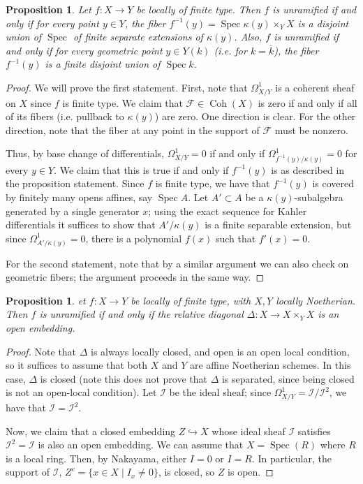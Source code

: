 \documentclass[10pt]{article}
\newtheorem{prop}[thm]{Proposition}
\theoremstyle{definition}
\DeclareMathOperator{\Coh}{Coh}
\DeclareMathOperator{\Spec}{Spec}
\begin{document}
\begin{prop}
Let $f: X \rightarrow Y$ be locally of finite type.  Then $f$ is unramified if and only if for every point $y \in Y$, the fiber $f^{-1}(y) = \Spec \kappa(y) \times_Y X$ is a disjoint union of $\Spec$ of finite separate extensions of $\kappa(y)$.  Also, $f$ is unramified if and only if for every geometric point $y \in Y(k)$ (i.e. for $k=\overline{k}$), the fiber $f^{-1}(y)$ is a finite disjoint union of $\Spec k$.
\end{prop}
\begin{proof}
We will prove the first statement.  First, note that $\Omega^1_{X/Y}$ is a coherent sheaf on $X$ since $f$ is finite type.  We claim that $\mathcal{F} \in \Coh(X)$ is zero if and only if all of its fibers (i.e. pullback to $\kappa(y)$) are zero.  One direction is clear.  For the other direction, note that the fiber at any point in the support of $\mathcal{F}$ must be nonzero.

Thus, by base change of differentials, $\Omega^1_{X/Y} = 0$ if and only if $\Omega^1_{f^{-1}(y)/\kappa(y)} = 0$ for every $y \in Y$.  We claim that this is true if and only if $f^{-1}(y)$ is as described in the proposition statement.  Since $f$ is finite type, we have that $f^{-1}(y)$ is covered by finitely many opens affines, say $\Spec A$.  Let $A' \subset A$ be a $\kappa(y)$-subalgebra generated by a single generator $x$; using the exact sequence for Kahler differentials it suffices to show that $A'/\kappa(y)$ is a finite separable extension, but since $\Omega^1_{A'/\kappa(y)} = 0$, there is a polynomial $f(x)$ such that $f'(x) = 0$.

For the second statement, note that by a similar argument we can also check on geometric fibers; the argument proceeds in the same way.
\end{proof}

\begin{prop}
et $f: X \rightarrow Y$ be locally of finite type, with $X, Y$ locally Noetherian.  Then $f$ is unramified if and only if the relative diagonal $\Delta: X \rightarrow X \times_Y X$ is an open embedding.
\end{prop}
\begin{proof}
Note that $\Delta$ is always locally closed, and open is an open local condition, so it suffices to assume that both $X$ and $Y$ are affine Noetherian schemes.  In this case, $\Delta$ is closed (note this does not prove that $\Delta$ is separated, since being closed is not an open-local condition).  Let $\mathcal{I}$ be the ideal sheaf; since $\Omega^1_{X/Y} = \mathcal{I}/\mathcal{I}^2$, we have that $\mathcal{I} = \mathcal{I}^2$.

Now, we claim that a closed embedding $Z \hookrightarrow X$ whose ideal sheaf $\mathcal{I}$ satisfies $\mathcal{I}^2 = \mathcal{I}$ is also an open embedding.  We can assume that $X = \Spec(R)$ where $R$ is a local ring.  Then, by Nakayama, either $I = 0$ or $I = R$.  In particular, the support of $\mathcal{I}$, $Z^c = \{x \in X \mid I_x \not= 0\}$, is closed, so $Z$ is open.
\end{proof}
\end{document}
